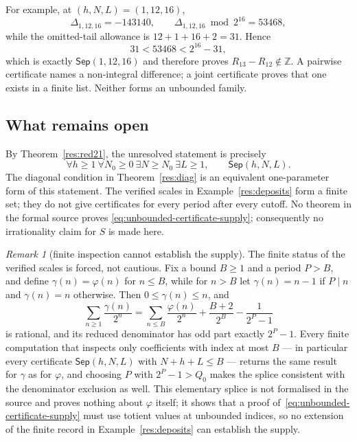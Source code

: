 \documentclass[11pt]{article}
\theoremstyle{definition}
\theoremstyle{remark}
\newtheorem*{remark}{Remark}
\newcommand{\Z}{\mathbb{Z}}
\newcommand{\ph}{\varphi}
\newcommand{\Qzero}{Q_0}
\begin{document}
For example, at $(h,N,L)=(1,12,16)$,
\[
\Delta_{1,12,16}=-143140,\qquad
\Delta_{1,12,16}\bmod 2^{16}=53468,
\]
while the omitted-tail allowance is $12+1+16+2=31$.  Hence
\[
31<53468<2^{16}-31,
\]
which is exactly $\mathsf{Sep}(1,12,16)$ and therefore proves
$R_{13}-R_{12}\notin\Z$.  A pairwise certificate names a non-integral
difference; a joint certificate proves that one exists in a finite list.
Neither forms an unbounded family.

\subsection{What remains open}\label{sec:249-open}

By Theorem~\ref{res:red21}, the unresolved statement is precisely
\[
\forall h\ge1\ \forall N_0\ge0\ \exists N\ge N_0\ \exists L\ge1,\qquad
\mathsf{Sep}(h,N,L).
\tag{5.1}\label{eq:unbounded-certificate-supply}
\]
The diagonal condition in Theorem~\ref{res:diag} is an equivalent
one-parameter form of this statement.  The verified scales in
Example~\ref{res:deposits} form a finite set; they do not give certificates
for every period after every cutoff.  No theorem in the formal source proves
\eqref{eq:unbounded-certificate-supply}; consequently no irrationality claim
for $S$ is made here.

\begin{remark}[finite inspection cannot establish the supply]
The finite status of the verified scales is forced, not cautious.  Fix a
bound \(B\ge1\) and a period \(P>B\), and define \(\gamma(n)=\ph(n)\) for
\(n\le B\), while for \(n>B\) let \(\gamma(n)=n-1\) if \(P\mid n\) and
\(\gamma(n)=n\) otherwise.  Then \(0\le\gamma(n)\le n\), and
\[
 \sum_{n\ge1}\frac{\gamma(n)}{2^n}
 =\sum_{n\le B}\frac{\ph(n)}{2^n}+\frac{B+2}{2^B}-\frac1{2^P-1}
\]
is rational, and its reduced denominator has odd part exactly \(2^P-1\).  Every
finite computation that inspects only coefficients with index at most \(B\)
--- in particular every certificate \(\mathsf{Sep}(h,N,L)\) with
\(N+h+L\le B\) --- returns the same result for \(\gamma\) as for \(\ph\),
and choosing \(P\) with \(2^P-1>\Qzero\) makes the splice consistent with
the denominator exclusion as well.  This elementary splice is not formalised
in the source and proves nothing about \(\ph\) itself; it shows that a proof
of~\eqref{eq:unbounded-certificate-supply} must use totient values at
unbounded indices, so no extension of the finite record in
Example~\ref{res:deposits} can establish the supply.
\end{remark}
\end{document}
